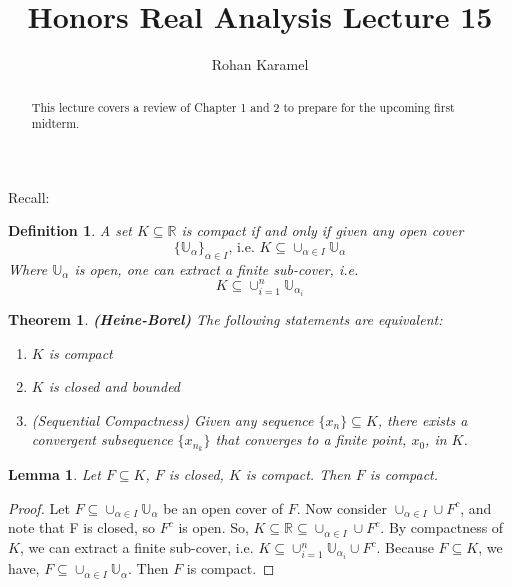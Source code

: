 \documentclass[12pt,reqno]{amsart}
\title{Honors Real Analysis Lecture 15}
\author{Rohan Karamel}
\theoremstyle{plain}
\newtheorem*{definition}{Definition}
\newtheorem*{theorem}{Theorem}
\newtheorem*{lemma}{Lemma}
\begin{document}
    \begin{abstract}
        This lecture covers a review of Chapter 1 and 2 to prepare for the upcoming first midterm.
    \end{abstract}

    \maketitle

    Recall:
    \begin{definition}
        A set $K \subseteq \mathbb{R}$ is compact if and only if given any open cover
        \[ {\{\mathbb{U}_\alpha \}}_{\alpha \in I}\text{, i.e. } K \subseteq \cup_{\alpha \in I} \mathbb{U}_\alpha\]
        Where  $\mathbb{U}_\alpha$ is open, one can extract a finite sub-cover, i.e.
        \[ K \subseteq \cup_{i = 1}^n \mathbb{U}_{\alpha_i}\]
    \end{definition}

    \begin{theorem}\textbf{(Heine-Borel)}
        The following statements are equivalent:
        \begin{enumerate}
            \item $K$ is compact
            \item $K$ is closed and bounded
            \item (Sequential Compactness) Given any sequence $\{x_n\} \subseteq K$, there exists a convergent subsequence $\{x_{n_k}\}$ that converges to a finite point, $x_0$, in $K$. 
        \end{enumerate}
    \end{theorem}

    \begin{lemma}
        Let $F \subseteq K$, $F$ is closed, $K$ is compact. Then $F$ is compact.
    \end{lemma}

    \begin{proof}
        Let $F \subseteq \cup_{\alpha \in I} \mathbb{U}_\alpha$ be an open cover of $F$. 
        Now consider $\cup_{\alpha \in I} \cup F^{c}$, and note that F is closed, so $F^c$ is open. 
        So, $K \subseteq \mathbb{R} \subseteq \cup_{\alpha \in I} \cup F^{c}$. 
        By compactness of $K$, we can extract a finite sub-cover, i.e. $K \subseteq \cup^n_{i = 1} \mathbb{U}_{\alpha_i} \cup F^c$. 
        Because $F \subseteq K$, we have, $F \subseteq \cup_{\alpha \in I} \mathbb{U}_\alpha$. 
        Then $F$ is compact.
    \end{proof}
\end{document}
